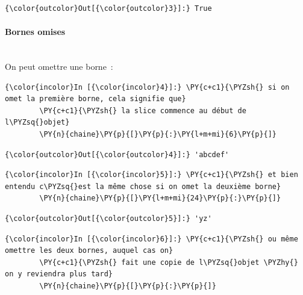 \begin{Verbatim}[commandchars=\\\{\}]
{\color{outcolor}Out[{\color{outcolor}3}]:} True
\end{Verbatim}
            
    \hypertarget{bornes-omises}{%
\paragraph{Bornes omises\\\\}\label{bornes-omises}}

    On peut omettre une borne~:

    \begin{Verbatim}[commandchars=\\\{\}]
{\color{incolor}In [{\color{incolor}4}]:} \PY{c+c1}{\PYZsh{} si on omet la première borne, cela signifie que}
        \PY{c+c1}{\PYZsh{} la slice commence au début de l\PYZsq{}objet}
        \PY{n}{chaine}\PY{p}{[}\PY{p}{:}\PY{l+m+mi}{6}\PY{p}{]}
\end{Verbatim}


\begin{Verbatim}[commandchars=\\\{\}]
{\color{outcolor}Out[{\color{outcolor}4}]:} 'abcdef'
\end{Verbatim}
            
    \begin{Verbatim}[commandchars=\\\{\}]
{\color{incolor}In [{\color{incolor}5}]:} \PY{c+c1}{\PYZsh{} et bien entendu c\PYZsq{}est la même chose si on omet la deuxième borne}
        \PY{n}{chaine}\PY{p}{[}\PY{l+m+mi}{24}\PY{p}{:}\PY{p}{]}
\end{Verbatim}


\begin{Verbatim}[commandchars=\\\{\}]
{\color{outcolor}Out[{\color{outcolor}5}]:} 'yz'
\end{Verbatim}
            
    \begin{Verbatim}[commandchars=\\\{\}]
{\color{incolor}In [{\color{incolor}6}]:} \PY{c+c1}{\PYZsh{} ou même omettre les deux bornes, auquel cas on}
        \PY{c+c1}{\PYZsh{} fait une copie de l\PYZsq{}objet \PYZhy{} on y reviendra plus tard}
        \PY{n}{chaine}\PY{p}{[}\PY{p}{:}\PY{p}{]}
\end{Verbatim}


